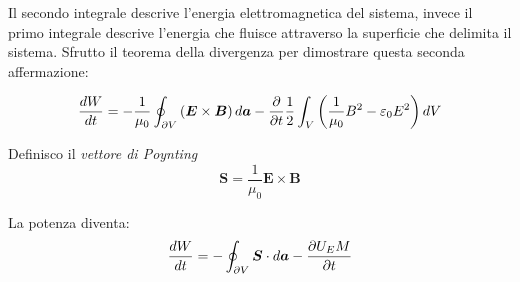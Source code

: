 \documentclass[a4paper]{scrarticle}
\begin{document}
Il secondo integrale descrive l'energia elettromagnetica del sistema, invece il primo integrale descrive l'energia che fluisce attraverso la superficie che delimita il sistema.
Sfrutto il teorema della divergenza per dimostrare questa seconda affermazione:

\begin{equation*}
    \frac{dW}{dt} = -\frac{1}{\mu_0}\oint_{\partial V} \left(\bm E \times \bm B\right) d\bm a - \pdv{t}\frac{1}{2}\int_V \left(\frac{1}{\mu_0}B^2- \varepsilon_0 {E^2}\right) dV
\end{equation*}

Definisco il \emph{vettore di Poynting}
\begin{equation}
    \bm S = \frac{1}{\mu_0} \bm E \times \bm B
\end{equation}

La potenza diventa:
\begin{equation}
    \frac{dW}{dt}= - \oint_{\partial V} \bm S \cdot d \bm a - \pdv{U_EM}{t}
\end{equation}
\end{document}
